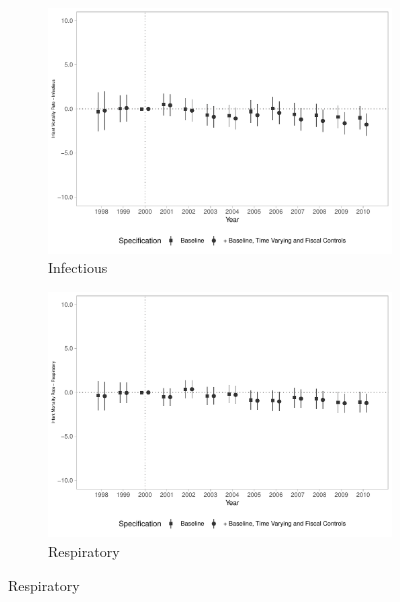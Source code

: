 \begin{figure}[h!]
    \begin{center}
    \caption{Effects on Infant Mortality Rates - By Cause}\label{fig:17}
    \begin{subfigure}{0.32\textwidth}
        \caption{\scriptsize Infectious}\label{fig:17a}
        \centering
        \includegraphics[width=\textwidth]{plots/tx_mi_infec_dist_ec29_baseline_dist_ec29_baseline_17.pdf}
    \end{subfigure}
    \begin{subfigure}{0.32\textwidth}
        \centering
        \caption{\scriptsize Respiratory}\label{fig:17b}
        \includegraphics[width=\textwidth]{plots/tx_mi_resp_dist_ec29_baseline_dist_ec29_baseline_17.pdf}
    \end{subfigure}

\end{center}
\end{figure}

